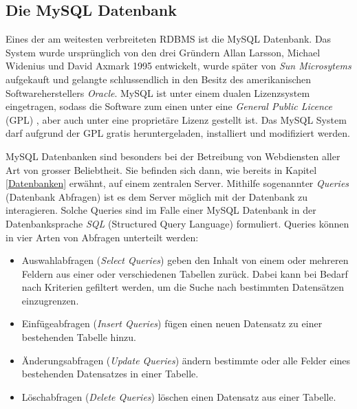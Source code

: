 \documentclass[../main.tex]{subfiles}
\begin{document}
	\subsection{Die MySQL Datenbank}
	Eines der am weitesten verbreiteten RDBMS ist die MySQL Datenbank. Das System wurde ursprünglich von den drei Gründern Allan Larsson, Michael Widenius und David Axmark 1995 entwickelt, wurde später von \emph{Sun Microsytems} aufgekauft und gelangte schlussendlich in den Besitz des amerikanischen Softwareherstellers \emph{Oracle}. MySQL ist unter einem dualen Lizenzsystem eingetragen, sodass die Software zum einen unter eine \emph{General Public Licence} (GPL) \cite{GPL}, aber auch unter eine proprietäre Lizenz \cite{proprietaereLizenz} gestellt ist. \cite{tecmint.com} Das MySQL System darf aufgrund der GPL gratis heruntergeladen, installiert und modifiziert werden.
	
	MySQL Datenbanken sind besonders bei der Betreibung von Webdiensten aller Art von grosser Beliebtheit. Sie befinden sich dann, wie bereits in Kapitel \ref{Datenbanken} erwähnt, auf einem zentralen Server. Mithilfe sogenannter \emph{Queries} (Datenbank Abfragen) ist es dem Server möglich mit der Datenbank zu interagieren. Solche Queries sind im Falle einer MySQL Datenbank in der Datenbanksprache \emph{SQL} (Structured Query Language) formuliert. Queries können in vier Arten von Abfragen unterteilt werden: \cite[S. 760]{IT-Handbuch}
	
	\begin{itemize}
		\item Auswahlabfragen (\emph{Select Queries}) geben den Inhalt von einem oder mehreren Feldern aus einer oder verschiedenen Tabellen zurück. Dabei kann bei Bedarf nach Kriterien gefiltert werden, um die Suche nach bestimmten Datensätzen einzugrenzen.\cite[S. 746]{IT-Handbuch}
		\item Einfügeabfragen (\emph{Insert Queries}) fügen einen neuen Datensatz zu einer bestehenden Tabelle hinzu.\cite[S. 746]{IT-Handbuch}
		\item Änderungsabfragen (\emph{Update Queries}) ändern bestimmte oder alle Felder eines bestehenden Datensatzes in einer Tabelle.\cite[S. 746]{IT-Handbuch}
		\item Löschabfragen (\emph{Delete Queries}) löschen einen Datensatz aus einer Tabelle. \cite[S. 746]{IT-Handbuch}
	\end{itemize}
	
\end{document}

